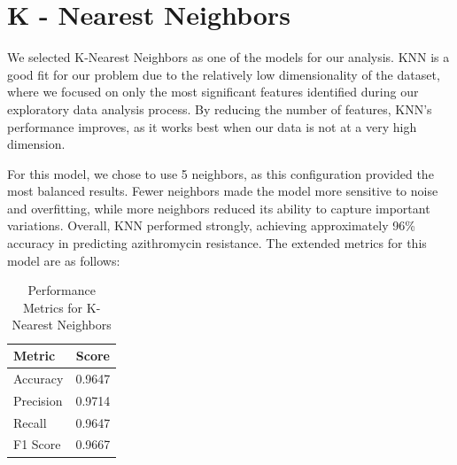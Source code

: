 \documentclass[manuscript,screen,review, nonacm]{acmart}
\begin{document}
  \section*{K - Nearest Neighbors}


    We selected K-Nearest Neighbors as one of the models for our analysis. 
    KNN is a good fit for our problem due to the relatively low dimensionality 
    of the dataset, where we focused on only the most significant features identified 
    during our exploratory data analysis process. By reducing the number of features, KNN's performance 
    improves, as it works best when our data is not at a very high dimension.

    For this model, we chose to use 5 neighbors, as this configuration 
    provided the most balanced results. Fewer neighbors made the model more 
    sensitive to noise and overfitting, while more neighbors reduced its ability 
    to capture important variations. Overall, KNN performed strongly, achieving 
    approximately 96\% accuracy in predicting azithromycin resistance. The extended 
    metrics for this model are as follows:


  \begin{table}[H]
    \centering
    \begin{tabular}{@{}lc@{}}
        \toprule
        \textbf{Metric} & \textbf{Score} \\ \midrule
        Accuracy  & 0.9647 \\
        Precision & 0.9714 \\
        Recall    & 0.9647 \\
        F1 Score  & 0.9667 \\ \bottomrule
    \end{tabular}
    \caption{Performance Metrics for K-Nearest Neighbors}

\end{table}
  
\end{document}
